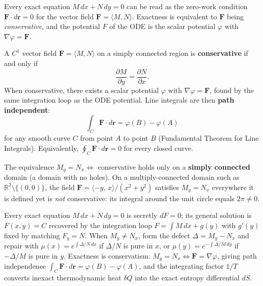 Every exact equation $M\,dx + N\,dy = 0$ can be read as the zero-work
condition $\mathbf{F}\cdot d\mathbf{r}=0$ for the vector field
$\mathbf{F}=\langle M,N\rangle$. Exactness is equivalent to $\mathbf{F}$
being \emph{conservative}, and the potential $F$ of the ODE is the scalar
potential $\varphi$ with $\nabla\varphi=\mathbf{F}$.

\begin{formulabox}
A $C^1$ vector field $\mathbf{F}=\langle M,N\rangle$ on a simply connected
region is \textbf{conservative} if and only if
\[
  \frac{\partial M}{\partial y} = \frac{\partial N}{\partial x}.
\]
When conservative, there exists a scalar potential $\varphi$ with
$\nabla\varphi = \mathbf{F}$, found by the same integration loop as the ODE
potential. Line integrals are then \textbf{path independent}:
\[
  \int_C \mathbf{F}\cdot d\mathbf{r}
  = \varphi\!\left(B\right) - \varphi\!\left(A\right)
\]
for any smooth curve $C$ from point $A$ to point $B$ (Fundamental Theorem for
Line Integrals). Equivalently, $\oint_C \mathbf{F}\cdot d\mathbf{r}=0$ for
every closed curve.
\end{formulabox}

\begin{warningbox}
The equivalence $M_y = N_x \iff$ conservative holds only on a
\textbf{simply connected} domain (a domain with no holes). On a
multiply-connected domain such as $\mathbb{R}^2\setminus\{(0,0)\}$, the field
$\mathbf{F}=\langle -y,\,x\rangle/(x^2+y^2)$ satisfies $M_y=N_x$ everywhere
it is defined yet is \emph{not} conservative: its integral around the unit
circle equals $2\pi\neq 0$.
\end{warningbox}

\vspace{0.6em}

\begin{conceptbox}
Every exact equation $M\,dx+N\,dy=0$ is secretly $dF=0$; its general solution
is \textcolor{accentorange}{$F(x,y)=C$} recovered by the integration loop
\textcolor{accentorange}{$F=\int M\,dx+g(y)$} with $g'(y)$ fixed by matching
$F_y=N$. When $M_y\neq N_x$, form the defect \textcolor{accentorange}{$\Delta=M_y-N_x$}
and repair with \textcolor{accentorange}{$\mu(x)=e^{\int\Delta/N\,dx}$} if
$\Delta/N$ is pure in $x$, or \textcolor{accentorange}{$\mu(y)=e^{-\int\Delta/M\,dy}$}
if $-\Delta/M$ is pure in $y$. Exactness is conservatism:
\textcolor{accentorange}{$M_y=N_x\iff\mathbf{F}=\nabla\varphi$}, giving
path independence $\int_C\mathbf{F}\cdot d\mathbf{r}=\varphi(B)-\varphi(A)$,
and the integrating factor $1/T$ converts inexact thermodynamic heat
$\delta Q$ into the exact entropy differential $dS$.
\end{conceptbox}


